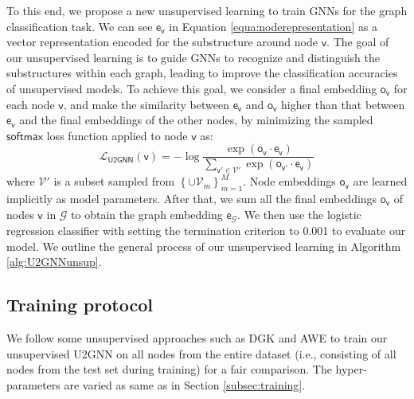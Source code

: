 \documentclass[twoside,leqno,twocolumn]{article}
\newcommand{\citep}{\cite}
\begin{document}
To this end, we propose a new unsupervised learning to train GNNs for the graph classification task.
We can see $\boldsymbol{\mathsf{e}}_\mathsf{v}$ in Equation \ref{equa:noderepresentation} as a vector representation encoded for the substructure around node $\mathsf{v}$.
The goal of our unsupervised learning is to guide GNNs to recognize and distinguish the substructures within each graph, leading to improve the classification accuracies of unsupervised models.
To achieve this goal, we consider a final embedding $\boldsymbol{\mathsf{o}}_{\mathsf{v}}$ for each node $\mathsf{v}$, and make the similarity between $\boldsymbol{\mathsf{e}}_\mathsf{v}$ and $\boldsymbol{\mathsf{o}}_{\mathsf{v}}$ higher than that between $\boldsymbol{\mathsf{e}}_\mathsf{v}$ and the final embeddings of the other nodes, by minimizing the sampled $\mathsf{softmax}$ loss function \citep{Jean2015} applied to node $\mathsf{v}$ as:
\begin{equation}
\mathcal{L}_{\mathsf{U2GNN}}\left(\mathsf{v}\right) = -\log \frac{\exp(\boldsymbol{\mathsf{o}}_\mathsf{v} \cdot \boldsymbol{\mathsf{e}}_{\mathsf{v}})}{\sum_{\mathsf{v'} \in \mathcal{V'}} \exp(\boldsymbol{\mathsf{o}}_\mathsf{v'} \cdot \boldsymbol{\mathsf{e}}_{\mathsf{v}})} 
\label{equa:unsupervisedU2GNNloss}
\end{equation}
where $\mathcal{V'}$ is a subset sampled from $\left\{\cup\mathcal{V}_m\right\}_{m=1}^M$. 
Node embeddings $\boldsymbol{\mathsf{o}}_{\mathsf{v}}$ are learned implicitly as model parameters.
After that, we sum all the final embeddings $\boldsymbol{\mathsf{o}}_{\mathsf{v}}$ of nodes $\mathsf{v}$ in $\mathcal{G}$ to obtain the graph embedding $\boldsymbol{\mathsf{e}}_{\mathcal{G}}$. 
We then use the logistic regression classifier \citep{Fan:2008} with setting the termination criterion to 0.001 to evaluate our model. 
We outline the general process of our unsupervised learning in Algorithm \ref{alg:U2GNNunsup}. 



\subsection{Training protocol} 

We follow some unsupervised approaches such as DGK \citep {yanardag2015deep} and AWE \citep{ivanov2018anonymous} to train our unsupervised U2GNN on all nodes from the entire dataset (i.e., consisting of all nodes from the test set during training) for a fair comparison. The hyper-parameters are varied as same as in Section \ref{subsec:training}.
\end{document}
